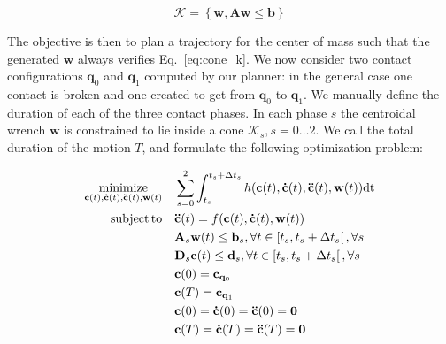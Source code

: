 \begin{equation}
\label{eq:cone_k}
	\mathcal{K} =  \left\{ \mathbf{w}, \mathbf{A}\mathbf{w} \leq \mathbf{b	} \right\}
\end{equation}

The objective 
is then to plan a trajectory for the center of mass such that the generated $\mathbf{w}$ always verifies Eq.~\ref{eq:cone_k}. 
We now consider two contact configurations  $\mathbf{q}_0$ and $\mathbf{q}_1$ computed by our planner: in the general case one contact is broken and one created to get from
$\mathbf{q}_0$ to $\mathbf{q}_1$. We manually define the duration of each of the three contact phases.
In each phase $s$ the centroidal wrench $\mathbf{w}$ is constrained to lie inside a cone $\mathcal{K}_s, s =0 \dots 2$.
We call the total duration of the motion $T$, and formulate the following optimization problem:

\begin{equation} \label{eq:lin_prog_rob} \begin{aligned}
\operatorname*{minimize}_{\mathbf{c}(t), \mathbf{\dot{c}}(t), \mathbf{\ddot{c}}(t), \mathbf{w}(t)}  \quad & \sum_{s=0}^{2} \int_{t_s}^{t_s + \Delta t_s}  h(\mathbf{c}(t), \mathbf{\dot{c}}(t), \mathbf{\ddot{c}}(t), \mathbf{w}(t)) \text{dt}  \\
\operatorname*{subject\,to} \quad & \mathbf{\ddot{c}}(t) = f(\mathbf{c}(t), \mathbf{\dot{c}}(t), \mathbf{w}(t)) \\
	\quad & \mathbf{A}_s \mathbf{w}(t)  \leq \mathbf{b}_s , \forall t \in  \left[t_s, t_s + \Delta t_s \right[, \forall s \\
	\quad & \mathbf{D}_s \mathbf{c}(t)  \leq \mathbf{d}_s , \forall t \in  \left[t_s, t_s + \Delta t_s \right[, \forall s \\
	\quad & \mathbf{c}(0)  = \mathbf{c}_{\mathbf{q}_0} \\
	\quad & \mathbf{c}(T)  = \mathbf{c}_{\mathbf{q}_1} \\
	\quad & \mathbf{c}(0)  = \mathbf{\dot{c}}(0)  = \mathbf{\ddot{c}}(0) = \mathbf{0}\\
	\quad & \mathbf{c}(T)  = \mathbf{\dot{c}}(T)  = \mathbf{\ddot{c}}(T) = \mathbf{0}\\
\end{aligned} \end{equation}


